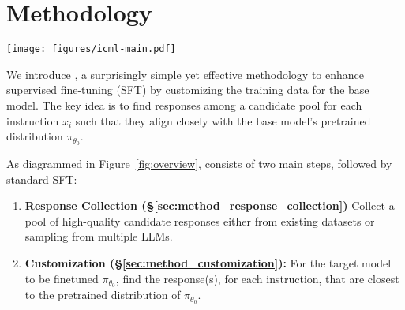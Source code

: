 \section{Methodology}
\label{sec:methodology}
\begin{figure*}
    \centering
    \texttt{[image: figures/icml-main.pdf]}
    \caption{An overview of \name. \name takes multiple off-the-shelf existing datasets and optionally generates new responses, finds overlapping instructions with multiple different responses and selects responses that align with the base model's distribution. This  dataset is then used for standard supervised fine-tuning.}
    \label{fig:overview}
\end{figure*}
We introduce \name, a surprisingly simple yet effective methodology to enhance supervised fine-tuning (SFT) by customizing the training data for the base model. 
The key idea is to find responses among a candidate pool for each instruction \(x_i\) such that they align closely with the base model's pretrained distribution \(\pi_{\theta_0}\). 

As diagrammed in Figure~\ref{fig:overview}, \name consists of two main steps, followed by standard SFT:
\begin{enumerate}
    \item \textbf{Response Collection (\S\ref{sec:method_response_collection})} Collect a pool of high-quality candidate responses either from existing datasets or sampling from multiple LLMs.
    \item \textbf{Customization (\S\ref{sec:method_customization}):} For the target model to be finetuned \(\pi_{\theta_0}\), find the response(s), for each instruction, that are closest to the pretrained distribution of \(\pi_{\theta_0}\).
\end{enumerate}



